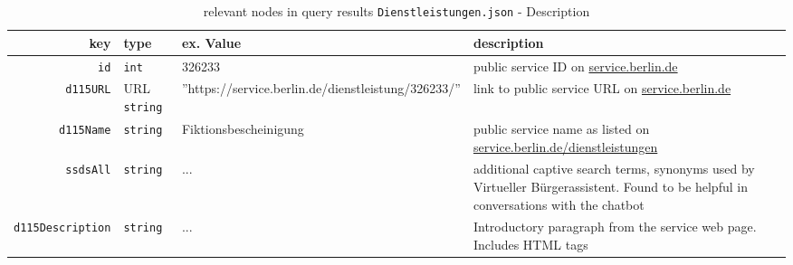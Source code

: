 \begin{table}[htbp]
	\caption{relevant nodes in query results \texttt{Dienstleistungen.json} - Description}
	\label{dienstleistung:descr}
	\begin{tabu} to \linewidth {  r | l | l | l }
		key & type & ex. Value & description\\ \hline
		
		\texttt{id} & \texttt{int} & 326233 & public service ID on \href{https://service.berlin.de}{service.berlin.de} \\
		
		\texttt{d115URL} & URL \texttt{string} & ''https://service.berlin.de/dienstleistung/326233/'' & link to public service URL on  \href{https://service.berlin.de}{service.berlin.de} \\
		
		\texttt{d115Name} & \texttt{string} & Fiktionsbescheinigung & public service name as listed on \href{https://service.berlin.de}{service.berlin.de/dienstleistungen} \\		
		
		\texttt{ssdsAll} & \texttt{string} & ... & additional captive search terms, synonyms used by Virtueller Bürgerassistent. Found to be helpful in conversations with the chatbot \\		
		
		\texttt{d115Description} & \texttt{string} & ... & Introductory paragraph from the service web page. 
		Includes HTML tags \\ %
		

\end{tabu}
\end{table}
